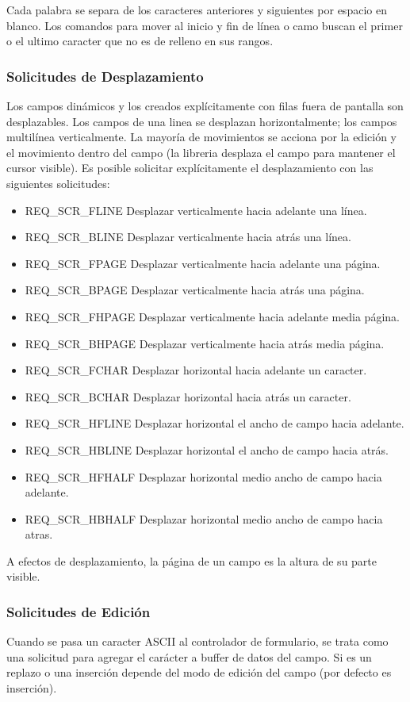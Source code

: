 \documentclass{article}
\begin{document}
Cada palabra se separa de los caracteres anteriores y siguientes por espacio en
blanco. Los comandos para mover al inicio y fin de línea o camo buscan el
primer o el ultimo caracter que no es de relleno en sus rangos.

\subsubsection{Solicitudes de Desplazamiento}%
Los campos dinámicos y los creados explícitamente con filas fuera de pantalla
son desplazables. Los campos de una linea se desplazan horizontalmente; los
campos multilínea verticalmente. La mayoría de movimientos se acciona por la
edición y el movimiento dentro del campo (la libreria desplaza el campo para
mantener el cursor visible). Es posible solicitar explícitamente el
desplazamiento con las siguientes solicitudes:

\begin{itemize}
  \item REQ\_SCR\_FLINE Desplazar verticalmente hacia adelante una línea.
  \item REQ\_SCR\_BLINE Desplazar verticalmente hacia atrás una línea.
  \item REQ\_SCR\_FPAGE Desplazar verticalmente hacia adelante una página.
  \item REQ\_SCR\_BPAGE Desplazar verticalmente hacia atrás una página.
  \item REQ\_SCR\_FHPAGE Desplazar verticalmente hacia adelante media página.
  \item REQ\_SCR\_BHPAGE Desplazar verticalmente hacia atrás media página.
  \item REQ\_SCR\_FCHAR Desplazar horizontal hacia adelante un caracter.
  \item REQ\_SCR\_BCHAR Desplazar horizontal hacia atrás un caracter.
  \item REQ\_SCR\_HFLINE Desplazar horizontal el ancho de campo hacia adelante.
  \item REQ\_SCR\_HBLINE Desplazar horizontal el ancho de campo hacia atrás.
  \item REQ\_SCR\_HFHALF Desplazar horizontal medio ancho de campo hacia adelante.
  \item REQ\_SCR\_HBHALF Desplazar horizontal medio ancho de campo hacia atras.
\end{itemize}

A efectos de desplazamiento, la página de un campo es la altura de su parte visible.

\subsubsection{Solicitudes de Edición}%
Cuando se pasa un caracter ASCII al controlador de formulario, se trata como
una solicitud para agregar el carácter a buffer de datos del campo. Si es un
replazo o una inserción depende del modo de edición del campo (por defecto es
inserción).\\
\end{document}
